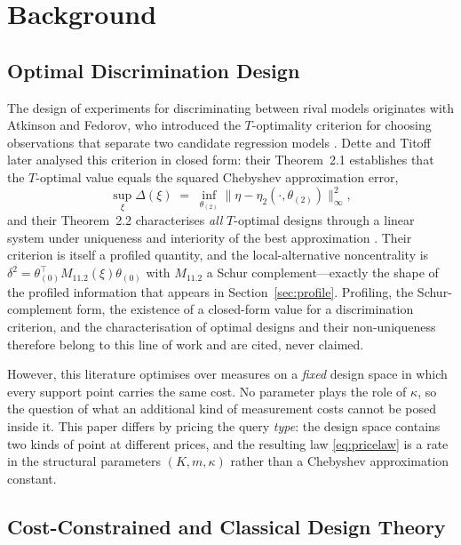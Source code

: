 \documentclass[conference]{IEEEtran}
\theoremstyle{definition}
\begin{document}
\section{Background}

\subsection{Optimal Discrimination Design}

The design of experiments for discriminating between rival models originates with Atkinson
and Fedorov, who introduced the $T$-optimality criterion for choosing observations that
separate two candidate regression models \cite{atkinson1975}. Dette and Titoff later
analysed this criterion in closed form: their Theorem~2.1 establishes that the $T$-optimal
value equals the squared Chebyshev approximation error,
\begin{equation}
\sup_{\xi}\Delta(\xi)
  \;=\; \inf_{\theta_{(2)}}\bigl\lVert \eta-\eta_{2}(\cdot,\theta_{(2)})\bigr\rVert_{\infty}^{2},
\label{eq:chebyshev}
\end{equation}
and their Theorem~2.2 characterises \emph{all} $T$-optimal designs through a linear system
under uniqueness and interiority of the best approximation \cite{dette2009}. Their criterion
is itself a profiled quantity, and the local-alternative noncentrality is
$\delta^{2}=\theta_{(0)}^{\top}M_{11.2}(\xi)\theta_{(0)}$ with $M_{11.2}$ a Schur
complement---exactly the shape of the profiled information that appears in
Section~\ref{sec:profile}. Profiling, the Schur-complement form, the existence of a
closed-form value for a discrimination criterion, and the characterisation of optimal
designs and their non-uniqueness therefore belong to this line of work and are cited, never
claimed.

However, this literature optimises over measures on a \emph{fixed} design space in which
every support point carries the same cost. No parameter plays the role of $\kappa$, so the
question of what an additional kind of measurement costs cannot be posed inside it. This
paper differs by pricing the query \emph{type}: the design space contains two kinds of
point at different prices, and the resulting law \eqref{eq:pricelaw} is a rate in the
structural parameters $(K,m,\kappa)$ rather than a Chebyshev approximation constant.

\subsection{Cost-Constrained and Classical Design Theory}
\end{document}
